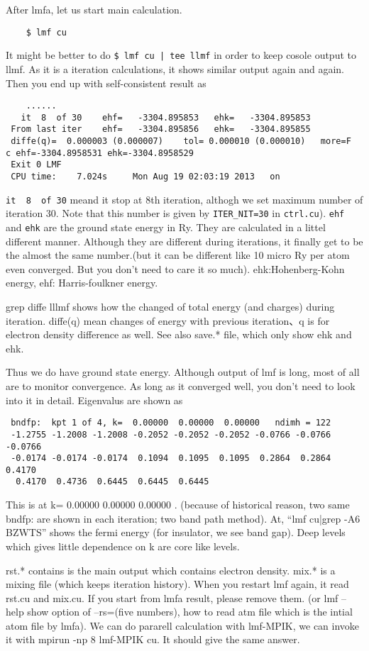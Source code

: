 \documentclass[a4paper,10pt,epsf,fleqn]{article}
\begin{document}
After lmfa, let us start main calculation.
\begin{verbatim}
    $ lmf cu
\end{verbatim}
It might be better to do
\verb+$ lmf cu | tee llmf+
in order to keep cosole output to llmf. 
As it is a iteration calculations, 
it shows similar output again and again.
Then you end up with self-consistent result as
\begin{verbatim}
    ......
   it  8  of 30    ehf=   -3304.895853   ehk=   -3304.895853
 From last iter    ehf=   -3304.895856   ehk=   -3304.895855
 diffe(q)=  0.000003 (0.000007)    tol= 0.000010 (0.000010)   more=F
c ehf=-3304.8958531 ehk=-3304.8958529
 Exit 0 LMF 
 CPU time:    7.024s     Mon Aug 19 02:03:19 2013   on  
\end{verbatim}
\verb+it  8  of 30+ meand it stop at 8th iteration, althogh we set
maximum number of iteration 30. Note that this number is 
given by \verb+ITER_NIT=30+ in \verb+ctrl.cu+).
\verb+ehf+ and \verb+ehk+ are the ground state energy in Ry.
They are calculated in a littel different manner. Although
they are different during iterations, it finally get to be the
almost the same number.(but it can be different like 10 micro Ry per atom
even converged. But you don't need to care it so much).
ehk:Hohenberg-Kohn energy, ehf: Harris-foulkner energy.

grep diffe lllmf shows how the changed of total energy (and charges)
during iteration. diffe(q) mean  changes of energy with previous
iteration、q is for electron density difference as well.
See also save.* file, which only show ehk and ehk.

Thus we do have ground state energy.
Although output of lmf is long, most of all are to monitor
convergence.
As long as it converged well, you don't need to look into it in detail.
Eigenvalus are shown as
\begin{verbatim}
 bndfp:  kpt 1 of 4, k=  0.00000  0.00000  0.00000   ndimh = 122
 -1.2755 -1.2008 -1.2008 -0.2052 -0.2052 -0.2052 -0.0766 -0.0766 -0.0766
 -0.0174 -0.0174 -0.0174  0.1094  0.1095  0.1095  0.2864  0.2864  0.4170
  0.4170  0.4736  0.6445  0.6445  0.6445
\end{verbatim}
This is at k=  0.00000  0.00000  0.00000 .
(because of historical reason, two same bndfp: are shown in each
iteration; two band path method). At,  ``lmf cu|grep -A6 BZWTS'' shows the fermi energy
(for insulator, we see band gap). 
Deep levels which gives little dependence on k are core like levels.

rst.* contains is the main output which contains electron density.
mix.* is a mixing file (which keeps iteration history).
When you restart lmf again, it read rst.cu and mix.cu.
If you start from lmfa result, please remove them.
(or lmf --help show option of --rs=(five numbers), 
how to read atm file which is the intial atom file by lmfa).
We can do pararell calculation with lmf-MPIK, 
we can invoke it with mpirun -np 8 lmf-MPIK cu. It should give the
same answer.
\end{document}
